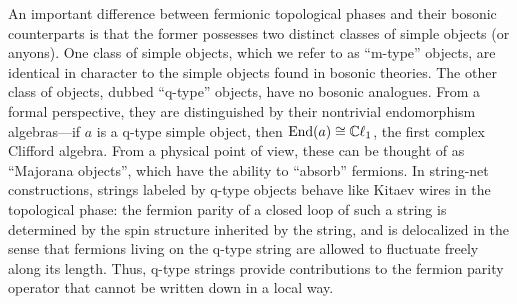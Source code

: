 
An important difference between fermionic topological phases and their bosonic counterparts is that 
the former possesses two distinct classes of simple objects (or anyons). 
One class of simple objects, which we refer to as ``m-type'' objects, are identical in character
to the simple objects found in bosonic theories. 
The other class of objects, dubbed ``q-type'' objects, have no bosonic analogues. 
From a formal perspective, they are distinguished by their nontrivial endomorphism algebras---if 
$a$ is a q-type simple object, then $\text{End}(a) \cong \mathbb{C}\ell_1$, the first complex Clifford algebra. 
From a physical point of view, these can be thought of as ``Majorana objects'', which have the ability 
to ``absorb'' fermions. 
In string-net constructions, strings labeled by q-type objects behave like Kitaev wires in the 
topological phase: the fermion parity of a closed loop of such a string is determined by 
the spin structure inherited by the string, and is delocalized in the sense that fermions living on the q-type string are allowed to fluctuate freely along its length.
Thus, q-type strings provide contributions to the fermion parity operator that cannot be written down 
in a local way. 

